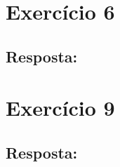 \documentclass{article}
\begin{document}
\newpage

\section*{Exercício 6}

\bigskip

\subsection*{Resposta:}


\newpage

\section*{Exercício 9}

\bigskip

\subsection*{Resposta:}
\end{document}
